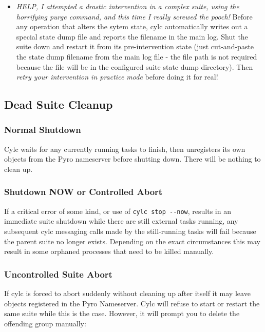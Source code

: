 \documentclass[11pt,a4paper]{article}
\begin{document}
\begin{itemize}
    \item {\em HELP, I attempted a drastic intervention in a complex
        suite, using the horrifying purge command, and this time I
        really screwed the pooch!} Before any operation that alters the
        sytem state, cylc automatically writes out a special state dump
        file and reports the filename in the main log. Shut the suite
        down and restart it from its pre-intervention state (just
        cut-and-paste the state dump filename from the main log file -
        the file path is not required because the file will be in the
        configured suite state dump directory).  Then {\em retry your
        intervention in practice mode} before doing it for real!

\end{itemize}

\subsection{Dead Suite Cleanup}
\label{DeadSuiteCleanup}

\subsubsection{Normal Shutdown}

Cylc waits for any currently running tasks to finish, then
unregisters its own objects from the Pyro nameserver before shutting
down. There will be nothing to clean up. 

\subsubsection{Shutdown NOW or Controlled Abort}

If a critical error of some kind, or use of \lstinline=cylc stop --now=,
results in an immediate suite shutdown while there are still external
tasks running, any subsequent cylc messaging calls made by the
still-running tasks will fail because the parent suite no longer
exists. Depending on the exact circumstances this may result in some 
orphaned processes that need to be killed manually.

\subsubsection{Uncontrolled Suite Abort}

If cylc is forced to abort suddenly without cleaning up after itself it
may leave objects registered in the Pyro Nameserver. Cylc will refuse
to start or restart the same suite while this is the case. However, it
will prompt you to delete the offending group manually:
\end{document}
